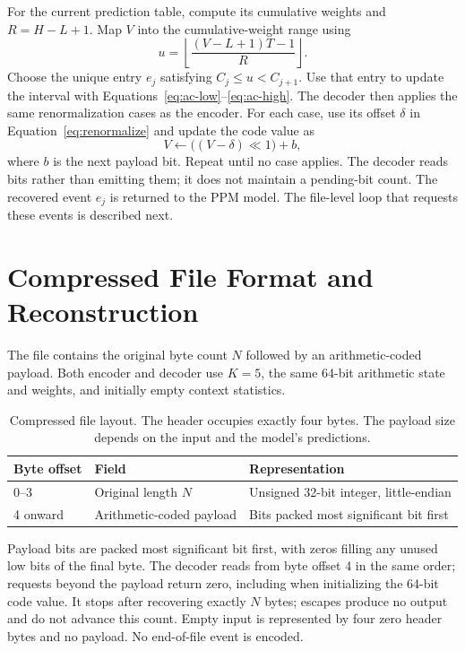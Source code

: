 \documentclass[12pt,onecolumn]{article}
\begin{document}
For the current prediction table, compute its cumulative weights and
$R=H-L+1$. Map $V$ into the cumulative-weight range using
\begin{equation}
  u=\left\lfloor
    \frac{(V-L+1)T-1}{R}
  \right\rfloor.
  \label{eq:ac-decode}
\end{equation}
Choose the unique entry $e_j$ satisfying $C_j\leq u<C_{j+1}$.
Use that entry to update the interval with
Equations~\eqref{eq:ac-low}--\eqref{eq:ac-high}.
The decoder then applies the same renormalization cases as the encoder.
For each case, use its offset $\delta$ in Equation~\eqref{eq:renormalize}
and update the code value as
\begin{equation}
  V\leftarrow \bigl((V-\delta)\ll1\bigr)+b,
\end{equation}
where $b$ is the next payload bit. Repeat until no case applies.
The decoder reads bits rather than emitting them; it does not maintain a
pending-bit count.
The recovered event $e_j$ is returned to the PPM model.
The file-level loop that requests these events is described next.
\FloatBarrier

\section{Compressed File Format and Reconstruction}
\label{sec:file-format}
\label{sec:bit-packing}

The file contains the original byte count $N$ followed by an arithmetic-coded
payload. Both encoder and decoder use $K=5$, the same 64-bit arithmetic
state and weights, and initially empty context statistics.

\begin{table}[htbp]
\centering
\begingroup
{}
\small
\renewcommand{\arraystretch}{1.4}
\begin{tabularx}{\textwidth}{@{}l l X@{}}
\toprule
Byte offset & Field & Representation\\
\midrule
0--3 & Original length $N$ & Unsigned 32-bit integer, little-endian\\
4 onward & Arithmetic-coded payload & Bits packed most significant bit first\\
\bottomrule
\end{tabularx}
\endgroup
\caption{Compressed file layout. The header occupies exactly four bytes.
The payload size depends on the input and the model's predictions.}
\label{tab:file-layout}
\end{table}

Payload bits are packed most significant bit first, with zeros filling any
unused low bits of the final byte. The decoder reads from byte offset 4
in the same order; requests beyond the payload return zero, including when
initializing the 64-bit code value. It stops after recovering exactly $N$
bytes; escapes produce no output and do not advance this count. Empty input
is represented by four zero header bytes and no payload. No end-of-file
event is encoded.
\end{document}
